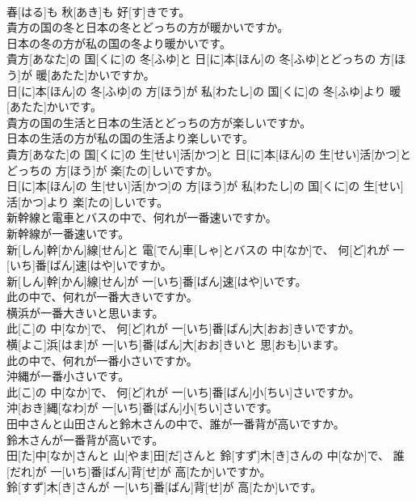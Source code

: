 \documentclass[8pt]{extreport}
\begin{document}
\begin{CJK}{UTF8}{min}
\\	春[はる]も 秋[あき]も 好[す]きです。
\\	貴方の国の冬と日本の冬とどっちの方が暖かいですか。 
\\	日本の冬の方が私の国の冬より暖かいです。	
\\	貴方[あなた]の 国[くに]の 冬[ふゆ]と 日[に]本[ほん]の 冬[ふゆ]とどっちの 方[ほう]が 暖[あたた]かいですか。 
\\	日[に]本[ほん]の 冬[ふゆ]の 方[ほう]が 私[わたし]の 国[くに]の 冬[ふゆ]より 暖[あたた]かいです。
\\	貴方の国の生活と日本の生活とどっちの方が楽しいですか。 
\\	日本の生活の方が私の国の生活より楽しいです。	
\\	貴方[あなた]の 国[くに]の 生[せい]活[かつ]と 日[に]本[ほん]の 生[せい]活[かつ]とどっちの 方[ほう]が 楽[たの]しいですか。 
\\	日[に]本[ほん]の 生[せい]活[かつ]の 方[ほう]が 私[わたし]の 国[くに]の 生[せい]活[かつ]より 楽[たの]しいです。
\\	新幹線と電車とバスの中で、何れが一番速いですか。 
\\	新幹線が一番速いです。	
\\	新[しん]幹[かん]線[せん]と 電[でん]車[しゃ]とバスの 中[なか]で、 何[ど]れが 一[いち]番[ばん]速[はや]いですか。 
\\	新[しん]幹[かん]線[せん]が 一[いち]番[ばん]速[はや]いです。
\\	此の中で、何れが一番大きいですか。 
\\	横浜が一番大きいと思います。	
\\	此[こ]の 中[なか]で、 何[ど]れが 一[いち]番[ばん]大[おお]きいですか。 
\\	横[よこ]浜[はま]が 一[いち]番[ばん]大[おお]きいと 思[おも]います。
\\	此の中で、何れが一番小さいですか。 
\\	沖縄が一番小さいです。	
\\	此[こ]の 中[なか]で、 何[ど]れが 一[いち]番[ばん]小[ちい]さいですか。 
\\	沖[おき]縄[なわ]が 一[いち]番[ばん]小[ちい]さいです。
\\	田中さんと山田さんと鈴木さんの中で、誰が一番背が高いですか。 
\\	鈴木さんが一番背が高いです。	
\\	田[た]中[なか]さんと 山[やま]田[だ]さんと 鈴[すず]木[き]さんの 中[なか]で、 誰[だれ]が 一[いち]番[ばん]背[せ]が 高[たか]いですか。 
\\	鈴[すず]木[き]さんが 一[いち]番[ばん]背[せ]が 高[たか]いです。

\end{CJK}
\end{document}
